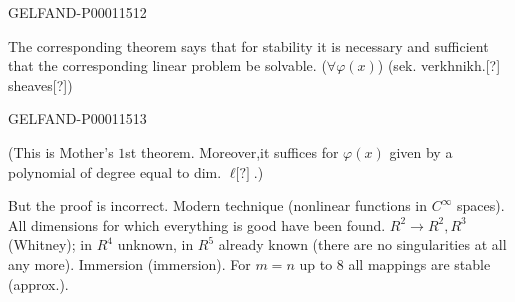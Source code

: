 \begin{GelfandAdjacentEvidence}{GELFAND-P000115}{12}

The corresponding theorem says that for stability it is necessary and sufficient
that the corresponding linear problem be solvable. ($\forall\varphi(x)$)
(sek. verkhnikh.[?] sheaves[?])
\end{GelfandAdjacentEvidence}
\begin{GelfandAdjacentEvidence}{GELFAND-P000115}{13}

(This is Mother's $1$st theorem. Moreover,it suffices for $\varphi(x)$
given by a polynomial of degree equal to dim. $\ell\text{[?]}$.)
\end{GelfandAdjacentEvidence}

But the proof is incorrect.
Modern technique (nonlinear functions in $C^\infty$ spaces).
All dimensions for which everything is good have been found.
$R^2\longrightarrow R^2,R^3$ (Whitney); in $R^4$ unknown,
in $R^5$ already known (there are no singularities at all any more).
Immersion (immersion).
For $m=n$ up to $8$ all mappings are stable (approx.).


